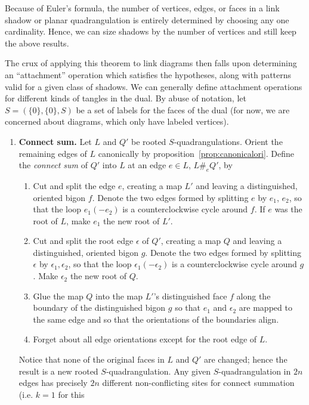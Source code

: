 \documentclass[amsmath,longbibliography,secnumarabic,floatfix,amssymb,nofootinbib,nobibnotes,letterpaper,11pt,tightenlines,notitlepage,showkeys,showlabels]{amsart}%
\begin{document}
Because of Euler's formula, the number of vertices, edges, or faces in a link shadow or planar
quadrangulation is entirely determined by choosing any one cardinality. Hence, we can size shadows
by the number of vertices and still keep the above results.

The crux of applying this theorem to link diagrams then falls upon
determining an ``attachment'' operation which satisfies the
hypotheses, along with patterns valid for a given class of shadows.
We can generally define attachment operations for different kinds of
tangles in the dual. By abuse of notation, let $S = (\{0\}, \{0\}, S)$ be a set of
labels for the faces of the dual (for now, we are concerned about
diagrams, which only have labeled vertices).
\begin{enumerate}
\item \textbf{Connect sum.} Let $L$ and $Q'$ be rooted $S$-quadrangulations. Orient the
  remaining edges of $L$ canonically by proposition~\ref{prop:canonicalori}. Define the
  \emph{connect sum} of $Q'$ into $L$ at an edge $e \in L$, $L \#_e Q'$, by
  \begin{enumerate}
  \item Cut and split the edge $e$, creating a map $L'$ and leaving a distinguished, oriented bigon
    $f$. Denote the two edges formed by splitting $e$ by $e_1$, $e_2$, so that the loop $e_1(-e_2)$
    is a counterclockwise cycle around $f$. If $e$ was the root of $L$, make $e_1$ the new root of
    $L'$.
  \item Cut and split the root edge $\epsilon$ of $Q'$, creating a map $Q$ and leaving a
    distinguished, oriented bigon $g$. Denote the two edges formed by splitting $\epsilon$ by
    $\epsilon_1, \epsilon_2$, so that the loop $\epsilon_1(-\epsilon_2)$ is a counterclockwise cycle
    around $g$. Make $\epsilon_2$ the new root of $Q$.
  \item Glue the map $Q$ into the map $L'$'s distinguished face $f$ along the boundary of the
    distinguished bigon $g$ so that $e_1$ and $\epsilon_2$ are mapped to the same edge and so that
    the orientations of the boundaries align.
  \item Forget about all edge orientations except for the root edge of $L$.
  \end{enumerate} Notice that none of the original faces in $L$ and $Q'$ are changed; hence the
  result is a new rooted $S$-quadrangulation. Any given $S$-quadrangulation in $2n$ edges
  has precisely $2n$ different non-conflicting sites for connect summation (i.e. $k = 1$ for this

\end{enumerate}
\end{document}
